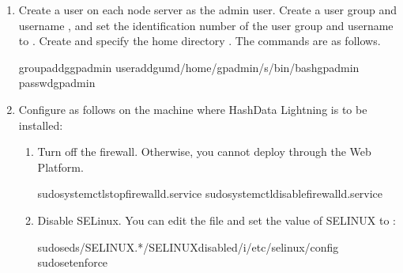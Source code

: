 \documentclass[letterpaper,10pt,english]{sphinxmanual}
\begin{document}
\begin{enumerate}
\item {} 
\sphinxAtStartPar
Create a  user on each node server as the admin user. Create a user group and username , and set the identification number of the user group and username to . Create and specify the home directory . The commands are as follows.

\begin{sphinxVerbatim}[commandchars=\\\{\}]
groupadd\PYGZhy{}ggpadmin
useradd\PYGZhy{}g\PYGZhy{}u\PYGZhy{}m\PYGZhy{}d/home/gpadmin/\PYGZhy{}s/bin/bashgpadmin
passwdgpadmin
\end{sphinxVerbatim}

\item {} 
\sphinxAtStartPar
Configure as follows on the machine where HashData Lightning is to be installed:
\begin{enumerate}
%
\item {} 
\sphinxAtStartPar
Turn off the firewall. Otherwise, you cannot deploy through the Web Platform.

\begin{sphinxVerbatim}[commandchars=\\\{\}]
sudosystemctlstopfirewalld.service
sudosystemctldisablefirewalld.service
\end{sphinxVerbatim}

\item {} 
\sphinxAtStartPar
Disable SELinux. You can edit the  file and set the value of SELINUX to :

\begin{sphinxVerbatim}[commandchars=\\\{\}]
sudoseds/\PYGZca{}SELINUX.*\PYGZdl{}/SELINUXdisabled/\PYGZhy{}i/etc/selinux/config
sudosetenforce
\end{sphinxVerbatim}


\end{enumerate}
\end{enumerate}
\end{document}
